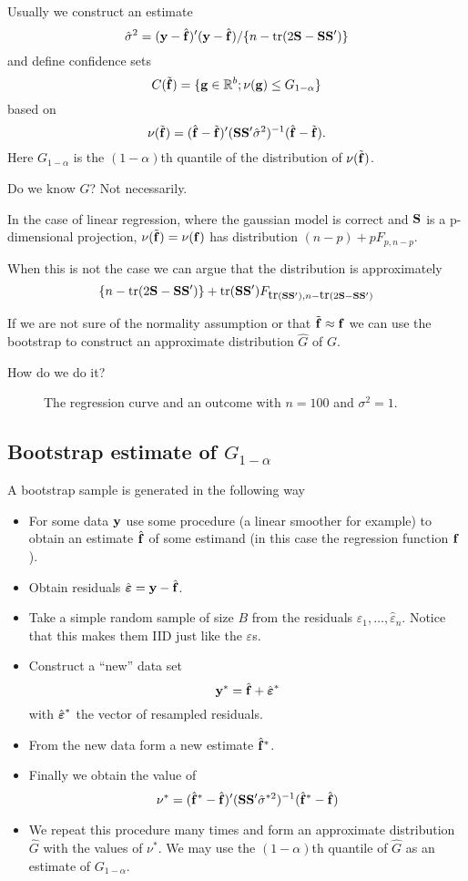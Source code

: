 Usually we construct an estimate 
\[
\hat{\sigma}^2 = ({\mathbf y} - \hat{{\mathbf f}})' ({\mathbf y} - \hat{{\mathbf f}})/ \{n - \mbox{tr}(2{\mathbf S} -
{\mathbf S}{\mathbf S}')\}
\]
and define confidence sets 
\[
C(\tilde{{\mathbf f}}) = \{ {\mathbf g}  \in {\mathbb R}^b; \nu({\mathbf g}) \leq G_{1-\alpha} \}
\]
based on 
\[ 
\nu(\tilde{{\mathbf f}}) =  (\hat{{\mathbf f}} - \tilde{{\mathbf f}})'({\mathbf S} {\mathbf S}'
\hat{\sigma}^2)^{-1}(\hat{{\mathbf f}} - \tilde{{\mathbf f}}). 
\]
Here $G_{1-\alpha}$ is the $(1-\alpha)$th quantile of the distribution
of $\nu(\tilde{{\mathbf f}})$.

Do we know $G$? Not necessarily.

In the case of linear regression, where the gaussian model is correct
and ${\mathbf S}$ is a 
p-dimensional projection, $\nu(\tilde{{\mathbf f}})=\nu({\mathbf f})$ has distribution
$(n-p) + p F_{p,n-p}$. 

When this is not the case we can argue that the
distribution is approximately 
\[
\{n-\mbox{tr}(2{\mathbf S} - {\mathbf S}{\mathbf S}')\} + \mbox{tr}({\mathbf S}{\mathbf S}') F_{\mbox{tr}({\mathbf S}{\mathbf S}'),n-\mbox{tr}(2{\mathbf S} -
  {\mathbf S}{\mathbf S}')}
\]

If we are not sure of the normality assumption or that $\tilde{{\mathbf f}}
\approx {\mathbf f}$ we can use the bootstrap to construct an approximate
distribution $\hat{G}$ of $G$.

How do we do it?

\begin{figure}[htb]
\caption{The regression curve and an outcome with $n=100$ and
  $\sigma^2=1$.}
\begin{center}
\end{center}
\end{figure}

\subsection{Bootstrap estimate of $G_{1-\alpha}$}
A bootstrap sample is generated in the following way
\begin{itemize}
\item For some data ${\mathbf y}$ use some procedure (a linear smoother for
  example) to obtain an estimate $\hat{{\mathbf f}}$ of some estimand (in this
  case the regression function ${\mathbf f}$). 
\item Obtain residuals $\hat{\mbox{\boldmath $\varepsilon$\unboldmath}} = {\mathbf y} - \hat{{\mathbf f}}$. 
\item Take a simple random sample of size $B$ from the residuals
  $\hat{\varepsilon}_1,\dots,\hat{\varepsilon}_n$. Notice that this makes
  them IID just like the $\varepsilon$s.
\item Construct a ``new'' data set 
\[{\mathbf y}^* = \hat{{\mathbf f}} +  \hat{\mbox{\boldmath $\varepsilon$\unboldmath}}^*
\]
with $\hat{\mbox{\boldmath $\varepsilon$\unboldmath}}^*$ the vector of resampled residuals.
\item From the new data form a new estimate $\hat{{\mathbf f}}^*$.
\item Finally we obtain the value of 
\[
\nu^* = (\hat{{\mathbf f}}^* - \hat{{\mathbf f}})'({\mathbf S} {\mathbf S}'
\hat{\sigma}^{*2})^{-1}(\hat{{\mathbf f}}^* - \hat{{\mathbf f}})
\]
\item We repeat this procedure many times and form an approximate
  distribution $\hat{G}$ with the values of $\nu^*$. We may use the $(1-\alpha)$th
  quantile of $\hat{G}$ as an estimate of $G_{1-\alpha}$.
\end{itemize}


